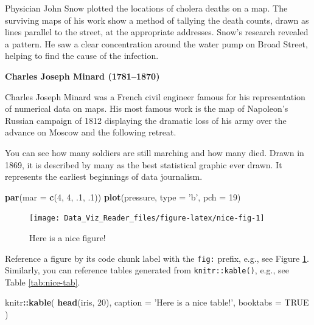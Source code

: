 \documentclass[]{book}
\newenvironment{Shaded}{\begin{snugshade}}{\end{snugshade}}
\newcommand{\KeywordTok}[1]{\textcolor[rgb]{0.13,0.29,0.53}{\textbf{#1}}}
\newcommand{\DataTypeTok}[1]{\textcolor[rgb]{0.13,0.29,0.53}{#1}}
\newcommand{\DecValTok}[1]{\textcolor[rgb]{0.00,0.00,0.81}{#1}}
\newcommand{\StringTok}[1]{\textcolor[rgb]{0.31,0.60,0.02}{#1}}
\newcommand{\OtherTok}[1]{\textcolor[rgb]{0.56,0.35,0.01}{#1}}
\newcommand{\OperatorTok}[1]{\textcolor[rgb]{0.81,0.36,0.00}{\textbf{#1}}}
\newcommand{\NormalTok}[1]{#1}
\theoremstyle{definition}
\theoremstyle{definition}
\theoremstyle{definition}
\theoremstyle{remark}
\begin{document}
Physician John Snow plotted the locations of cholera deaths on a map.
The surviving maps of his work show a method of tallying the death
counts, drawn as lines parallel to the street, at the appropriate
addresses. Snow's research revealed a pattern. He saw a clear
concentration around the water pump on Broad Street, helping to find the
cause of the infection.

\textbf{Charles Joseph Minard (1781--1870)}

Charles Joseph Minard was a French civil engineer famous for his
representation of numerical data on maps. His most famous work is the
map of Napoleon's Russian campaign of 1812 displaying the dramatic loss
of his army over the advance on Moscow and the following retreat.

You can see how many soldiers are still marching and how many died.
Drawn in 1869, it is described by many as the best statistical graphic
ever drawn. It represents the earliest beginnings of data journalism.

\begin{Shaded}
\begin{Highlighting}[]
\KeywordTok{par}\NormalTok{(}\DataTypeTok{mar =} \KeywordTok{c}\NormalTok{(}\DecValTok{4}\NormalTok{, }\DecValTok{4}\NormalTok{, .}\DecValTok{1}\NormalTok{, .}\DecValTok{1}\NormalTok{))}
\KeywordTok{plot}\NormalTok{(pressure, }\DataTypeTok{type =} \StringTok{'b'}\NormalTok{, }\DataTypeTok{pch =} \DecValTok{19}\NormalTok{)}
\end{Highlighting}
\end{Shaded}

\begin{figure}

{\centering \texttt{[image: Data\_Viz\_Reader\_files/figure-latex/nice-fig-1]} 

}

\caption{Here is a nice figure!}\label{fig:nice-fig}
\end{figure}

Reference a figure by its code chunk label with the \texttt{fig:}
prefix, e.g., see Figure \ref{fig:nice-fig}. Similarly, you can
reference tables generated from \texttt{knitr::kable()}, e.g., see Table
\ref{tab:nice-tab}.

\begin{Shaded}
\begin{Highlighting}[]
\NormalTok{knitr}\OperatorTok{::}\KeywordTok{kable}\NormalTok{(}
  \KeywordTok{head}\NormalTok{(iris, }\DecValTok{20}\NormalTok{), }\DataTypeTok{caption =} \StringTok{'Here is a nice table!'}\NormalTok{,}
  \DataTypeTok{booktabs =} \OtherTok{TRUE}
\NormalTok{)}
\end{Highlighting}
\end{Shaded}
\end{document}
